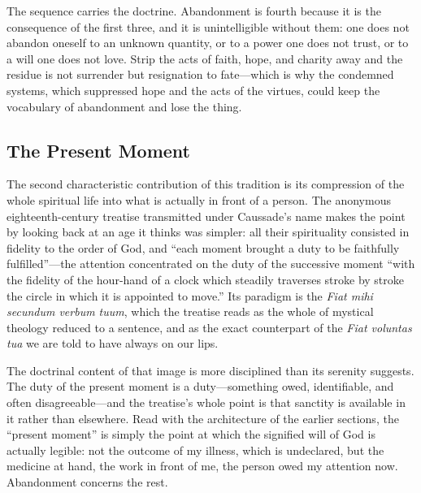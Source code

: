 The sequence carries the doctrine. Abandonment is fourth because it is the consequence of the first three, and it is unintelligible without them: one does not abandon oneself to an unknown quantity, or to a power one does not trust, or to a will one does not love. Strip the acts of faith, hope, and charity away and the residue is not surrender but resignation to fate---which is why the condemned systems, which suppressed hope and the acts of the virtues, could keep the vocabulary of abandonment and lose the thing.

\subsection{The Present Moment}

The second characteristic contribution of this tradition is its compression of the whole spiritual life into what is actually in front of a person. The anonymous eighteenth-century treatise transmitted under Caussade's name makes the point by looking back at an age it thinks was simpler: all their spirituality consisted in fidelity to the order of God, and ``each moment brought a duty to be faithfully fulfilled''---the attention concentrated on the duty of the successive moment ``with the fidelity of the hour-hand of a clock which steadily traverses stroke by stroke the circle in which it is appointed to move.'' Its paradigm is the \emph{Fiat mihi secundum verbum tuum}, which the treatise reads as the whole of mystical theology reduced to a sentence, and as the exact counterpart of the \emph{Fiat voluntas tua} we are told to have always on our lips.

The doctrinal content of that image is more disciplined than its serenity suggests. The duty of the present moment is a duty---something owed, identifiable, and often disagreeable---and the treatise's whole point is that sanctity is available in it rather than elsewhere. Read with the architecture of the earlier sections, the ``present moment'' is simply the point at which the signified will of God is actually legible: not the outcome of my illness, which is undeclared, but the medicine at hand, the work in front of me, the person owed my attention now. Abandonment concerns the rest.

